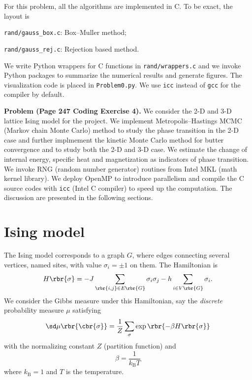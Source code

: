 \documentclass[english, nochinese]{pnote}
\begin{document}
For this problem, all the algorithms are implemented in C. To be exact, the layout is
\begin{partlist}
\item \verb"rand/gauss_box.c": Box--Muller method;
\item \verb"rand/gauss_rej.c": Rejection based method.
\end{partlist}
We write Python wrappers for C functions in \verb"rand/wrappers.c" and we invoke Python packages to summarize the numerical results and generate figures. The visualization code is placed in \verb"Problem0.py". We use \verb"icc" instead of \verb"gcc" for the compiler by default.

\textbf{Problem (Page 247 Coding Exercise 4).} We consider the 2-D and 3-D lattice Ising model for the project. We implement Metropolis--Hastings MCMC (Markov chain Monte Carlo) method to study the phase transition in the 2-D case and further implmement the kinetic Monte Carlo method for butter convergence and to study both the 2-D and 3-D case. We estimate the change of internal energy, specific heat and magnetization as indicators of phase transition. We invoke RNG (random number generator) routines from Intel MKL (math kernel library). We deploy OpenMP to introduce parallelism and compile the C source codes with \verb"icc" (Intel C compiler) to speed up the computation. The discussion are presented in the following sections.

\section{Ising model}

The Ising model corresponds to a graph $G$, where edges connecting several vertices, named sites, with value $ \sigma_i = \pm 1 $ on them. The Hamiltonian is
\begin{equation}
H \rbr{\sigma} = - J \sum_{ \rbr{ i, j } \in E \rbr{G} } \sigma_i \sigma_j - h \sum_{ i \in V \rbr{G} } \sigma_i.
\end{equation}
We consider the Gibbs measure under this Hamiltonian, say the \emph{discrete} probability measure $\mu$ satisfying
\begin{equation}
\sd \mu \rbr{\cbr{\sigma}} = \frac{1}{Z} \sum_{\sigma} \exp \rbr{ -\beta H \rbr{\sigma} }
\end{equation}
with the normalizing constant $Z$ (partition function) and
\begin{equation}
\beta = \frac{1}{ k_{\text{B}} T }
\end{equation}
where $ k_{\text{B}} = 1 $ and $T$ is the temperature.
\end{document}
